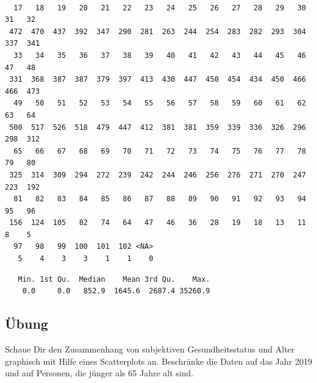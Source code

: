 \documentclass[
  letterpaper,
  DIV=11,
  numbers=noendperiod]{scrartcl}
\newenvironment{Shaded}{\begin{snugshade}}{\end{snugshade}}
\newcommand{\FunctionTok}[1]{\textcolor[rgb]{0.28,0.35,0.67}{#1}}
\newcommand{\NormalTok}[1]{\textcolor[rgb]{0.00,0.23,0.31}{#1}}
\newcommand{\SpecialCharTok}[1]{\textcolor[rgb]{0.37,0.37,0.37}{#1}}
\begin{document}
\begin{verbatim}

  17   18   19   20   21   22   23   24   25   26   27   28   29   30   31   32 
 472  470  437  392  347  290  281  263  244  254  283  282  293  304  337  341 
  33   34   35   36   37   38   39   40   41   42   43   44   45   46   47   48 
 331  368  387  387  379  397  413  430  447  450  454  434  450  466  466  473 
  49   50   51   52   53   54   55   56   57   58   59   60   61   62   63   64 
 500  517  526  518  479  447  412  381  381  359  339  336  326  296  298  312 
  65   66   67   68   69   70   71   72   73   74   75   76   77   78   79   80 
 325  314  309  294  272  239  242  244  246  256  276  271  270  247  223  192 
  81   82   83   84   85   86   87   88   89   90   91   92   93   94   95   96 
 156  124  105   82   74   64   47   46   36   28   19   18   13   11    8    5 
  97   98   99  100  101  102 <NA> 
   5    4    3    3    1    1    0 
\end{verbatim}

\begin{Shaded}
\end{Shaded}

\begin{verbatim}
   Min. 1st Qu.  Median    Mean 3rd Qu.    Max. 
    0.0     0.0   852.9  1645.6  2687.4 35260.9 
\end{verbatim}

\subsection{Übung}\label{uxfcbung-10}

Schaue Dir den Zusammenhang von subjektiven Gesundheitsstatus und Alter
graphisch mit Hilfe eines Scatterplots an. Beschränke die Daten auf das
Jahr 2019 und auf Personen, die jünger als 65 Jahre alt sind.
\end{document}
